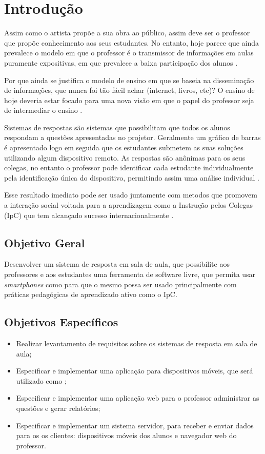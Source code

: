 \chapter{Introdução}

Assim como o artista propõe a sua obra ao público, assim deve ser o professor que
propõe conhecimento aos seus estudantes. No entanto, hoje parece que ainda prevalece
o modelo em que o professor é o transmissor de informações em aulas puramente expositivas,
em que prevalece a baixa participação dos alunos \cite[p. 8]{Silva2001}.

Por que ainda se justifica o modelo de ensino em que se baseia
na disseminação de informações, que nunca foi tão fácil achar (internet,
livros, etc)? O ensino de hoje deveria estar focado para uma nova
visão em que o papel do professor seja de intermediar o ensino \cite[p. 19]{Araujo2013}.

Sistemas de respostas são sistemas que possibilitam que todos os alunos
respondam a questões apresentadas no projetor. Geralmente um gráfico de barras
é apresentado logo em seguida que os estudantes submetem as suas soluções
utilizando algum dispositivo remoto. As respostas são anônimas para os seus colegas,
no entanto o professor pode identificar cada estudante individualmente pela
identificação única do dispositivo, permitindo assim uma análise individual \cite[p. 1]{Kay2009}.


Esse resultado imediato pode ser usado juntamente
com metodos que promovem a interação social voltada para a aprendizagem como a
Instrução pelos Colegas (IpC) que tem alcançado sucesso internacionalmente \cite[p. 3]{Araujo2013}.

\section{Objetivo Geral}
Desenvolver um sistema de resposta em sala de aula,
que possibilite aos professores e aos estudantes uma ferramenta de software livre,
que permita usar {\textit{smartphones}} como {\clickers} para que o mesmo possa
ser usado principalmente com práticas pedagógicas de aprendizado ativo como o IpC.

\section{Objetivos Específicos}

\begin{itemize}
    \item Realizar levantamento de requisitos sobre os sistemas de resposta em sala de aula;
    \item Especificar e implementar uma aplicação para dispositivos móveis, que será utilizado como {\clickers};
    \item Especificar e implementar uma aplicação web para o professor administrar as questões e gerar relatórios;
    \item Especificar e implementar um sistema servidor, para receber e
    enviar dados para os os clientes: dispositivos móveis dos alunos e navegador
    web do professor.
\end{itemize}

